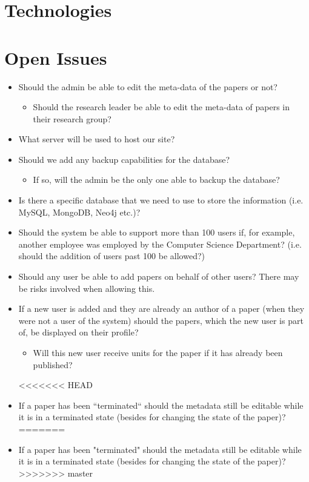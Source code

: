 \documentclass[a4paper,12pt]{article}
\begin{document}
\section{Technologies}

\newpage
\section{Open Issues}

\begin{itemize}	
\item Should the admin be able to edit the meta-data of the papers or not?
	\begin{itemize}
	\item Should the research leader be able to edit the meta-data of papers in their research group?
	\end{itemize}
\item What server will be used to host our site? 
\item Should we add any backup capabilities for the database?
	\begin{itemize}
	\item If so, will the admin be the only one able to backup the database?
	\end{itemize}
\item Is there a specific database that we need to use to store the information (i.e. MySQL, MongoDB, Neo4j etc.)?
\item Should the system be able to support more than 100 users if, for example, another employee was employed by the Computer Science Department? (i.e. should the addition of users past 100 be allowed?)
\item Should any user be able to add papers on behalf of other users? There may be risks involved when allowing this.
\item If a new user is added and they are already an author of a paper (when they were not a user of the system) should the papers, which the new user is part of, be displayed on their profile?
	\begin{itemize}
	\item Will this new user receive units for the paper if it has already been published?
	\end{itemize}
<<<<<<< HEAD
\item If a paper has been ``terminated`` should the metadata still be editable while it is in a terminated state (besides for changing the state of the paper)?
=======
\item If a paper has been "terminated" should the metadata still be editable while it is in a terminated state (besides for changing the state of the paper)?
>>>>>>> master
\end{itemize}
\end{document}
